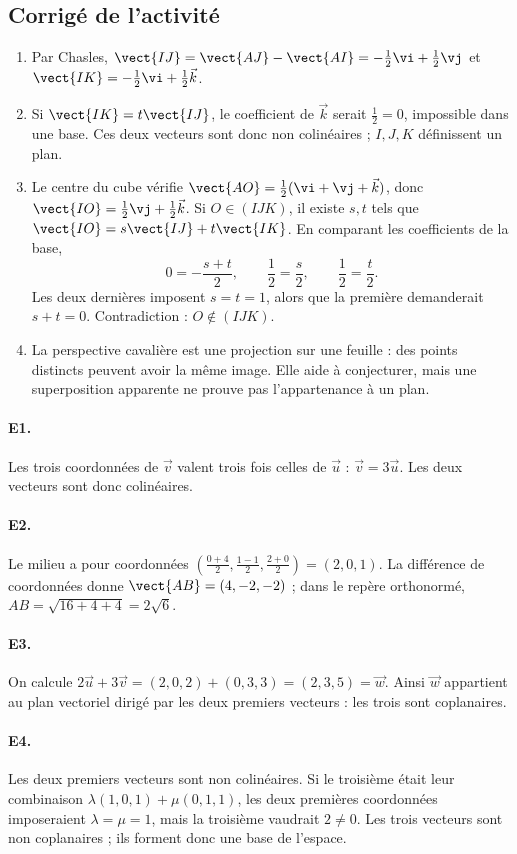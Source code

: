 \subsection{Corrigé de l'activité}\begin{enumerate}
\item Par Chasles, $\vect{IJ}=\vect{AJ}-\vect{AI}=-\frac12\vi +\frac12\vj $ et $\vect{IK}=-\frac12\vi +\frac12\vec k$.
\item Si $\vect{IK}=t\vect{IJ}$, le coefficient de $\vec k$ serait $\frac{1}{2}=0$, impossible dans une base. Ces deux vecteurs sont donc non colinéaires ; $I,J,K$ définissent un plan.
\item Le centre du cube vérifie $\vect{AO}=\frac12(\vi +\vj +\vec k)$, donc $\vect{IO}=\frac12\vj +\frac12\vec k$. Si $O\in(IJK)$, il existe $s,t$ tels que $\vect{IO}=s\vect{IJ}+t\vect{IK}$. En comparant les coefficients de la base,
\[0=-\frac{s+t}2,\qquad \frac12=\frac s2,\qquad \frac12=\frac t2.\]
Les deux dernières imposent $s=t=1$, alors que la première demanderait $s+t=0$. Contradiction : $O\notin(IJK)$.
\item La perspective cavalière est une projection sur une feuille : des points distincts peuvent avoir la même image. Elle aide à conjecturer, mais une superposition apparente ne prouve pas l'appartenance à un plan.
\end{enumerate}

\paragraph{E1.}Les trois coordonnées de $\vec v$ valent trois fois celles de $\vec u$ : $\vec v=3\vec u$. Les deux vecteurs sont donc colinéaires.

\paragraph{E2.}Le milieu a pour coordonnées $(\frac{0+4}{2},\frac{1-1}{2},\frac{2+0}{2})=(2,0,1)$. La différence de coordonnées donne $\vect{AB}=(4,-2,-2)$ ; dans le repère orthonormé, $AB=\sqrt{16+4+4}=2\sqrt6$.

\paragraph{E3.}On calcule $2\vec u+3\vec v=(2,0,2)+(0,3,3)=(2,3,5)=\vec w$. Ainsi $\vec w$ appartient au plan vectoriel dirigé par les deux premiers vecteurs : les trois sont coplanaires.

\paragraph{E4.}Les deux premiers vecteurs sont non colinéaires. Si le troisième était leur combinaison $\lambda(1,0,1)+\mu(0,1,1)$, les deux premières coordonnées imposeraient $\lambda=\mu=1$, mais la troisième vaudrait $2\ne0$. Les trois vecteurs sont non coplanaires ; ils forment donc une base de l'espace.

